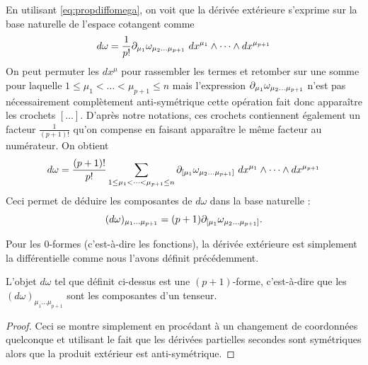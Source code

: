 \documentclass[a4paper,11pt]{report}
\begin{document}
            En utilisant \ref{eq:propdiffomega}, on voit que la dérivée extérieure s'exprime sur la base naturelle de l'espace cotangent comme
            \begin{equation}
                d\omega = \frac{1}{p!} \partial_{\mu_1}\omega_{\mu_2\dots\mu_{p+1}}~dx^{\mu_1}\wedge \dots\wedge dx^{\mu_{p+1}}
            \end{equation} 
            On peut permuter les $dx^\mu$ pour rassembler les termes et retomber sur une somme pour laquelle $1\leq\mu_1<\dots<\mu_{p+1}\leq n$ mais l'expression $\partial_{\mu_1}\omega_{\mu_2\dots\mu_{p+1}}$ n'est pas nécessairement complètement anti-symétrique cette opération fait donc apparaître les crochets $[\dots]$. D'après notre notations, ces crochets contiennent également un facteur $\frac{1}{(p+1)!}$ qu'on compense en faisant apparaître le même facteur au numérateur. On obtient
            \begin{equation}
                d\omega = \frac{(p+1)!}{p!} \sum_{1\leq\mu_1<\dots<\mu_{p+1}\leq n} \partial_{[\mu_1}\omega_{\mu_2\dots\mu_{p+1}]}~dx^{\mu_1}\wedge \dots\wedge dx^{\mu_{p+1}}
            \end{equation}
            Ceci permet de déduire les composantes de $d\omega$ dans la base naturelle :
            \begin{equation}
                (d\omega)_{\mu_1 \dots\mu_{p+1}} = (p+1) \partial_{[\mu_1}\omega_{\mu_2\dots\mu_{p+1}]}.
            \end{equation}
            
            \begin{rmk}
                Pour les $0$-formes (c'est-à-dire les fonctions), la dérivée extérieure est simplement la différentielle comme nous l'avons définit précédemment.
            \end{rmk}
            
            
            \begin{thm}\begin{leftbar}
                L'objet $d\omega$ tel que définit ci-dessus est une $(p+1)$-forme, c'est-à-dire que les $(d\omega)_{\mu_1 \dots\mu_{p+1}}$ sont les composantes d'un tenseur.
            \end{leftbar}\end{thm}
            
            \begin{proof}
                Ceci se montre simplement en procédant à un changement de coordonnées quelconque et utilisant le fait que les dérivées partielles secondes sont symétriques alors que la produit extérieur est anti-symétrique.
            \end{proof}
            
\end{document}
